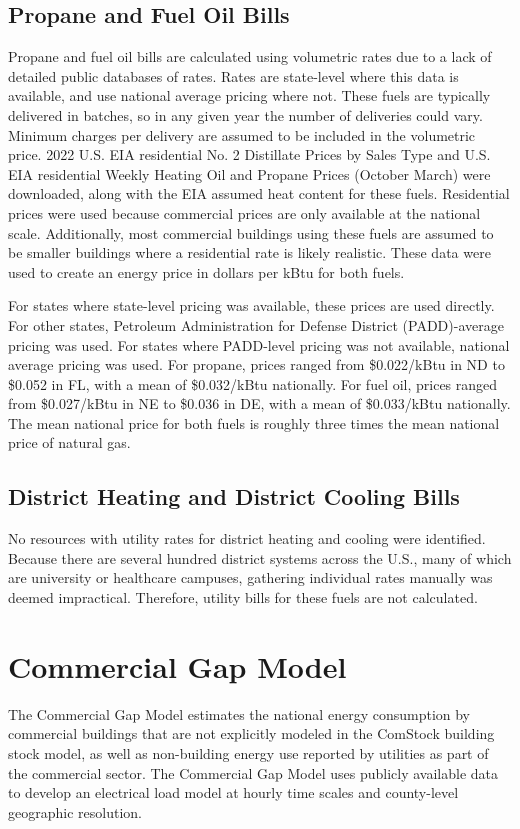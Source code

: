 \subsection{Propane and Fuel Oil Bills}
Propane and fuel oil bills are calculated using volumetric rates due to a lack of detailed public databases of rates. Rates are state-level where this data is available, and use national average pricing where not. These fuels are typically delivered in batches, so in any given year the number of deliveries could vary. Minimum charges per delivery are assumed to be included in the volumetric price. 2022 U.S. EIA residential No. 2 Distillate Prices by Sales Type and U.S. EIA residential Weekly Heating Oil and Propane Prices (October \- March) \citep{eia_fuel_oil_and_propane} were downloaded, along with the EIA assumed heat content for these fuels. Residential prices were used because commercial prices are only available at the national scale. Additionally, most commercial buildings using these fuels are assumed to be smaller buildings where a residential rate is likely realistic. These data were used to create an energy price in dollars per kBtu for both fuels.

For states where state-level pricing was available, these prices are used directly. For other states, Petroleum Administration for Defense District (PADD)-average pricing was used. For states where PADD-level pricing was not available, national average pricing was used. For propane, prices ranged from \$0.022/kBtu in ND to \$0.052 in FL, with a mean of \$0.032/kBtu nationally. For fuel oil, prices ranged from \$0.027/kBtu in NE to \$0.036 in DE, with a mean of \$0.033/kBtu nationally. The mean national price for both fuels is roughly three times the mean national price of natural gas.

\subsection{District Heating and District Cooling Bills}
No resources with utility rates for district heating and cooling were identified. Because there are several hundred district systems across the U.S., many of which are university or healthcare campuses, gathering individual rates manually was deemed impractical. Therefore, utility bills for these fuels are not calculated.

\section{Commercial Gap Model}
The Commercial Gap Model estimates the national energy consumption by commercial buildings that are not explicitly modeled in the ComStock building stock model, as well as non-building energy use reported by utilities as part of the commercial sector. The Commercial Gap Model uses publicly available data to develop an electrical load model at hourly time scales and county-level geographic resolution. 

